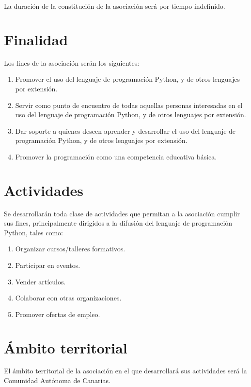 \documentclass[a4paper, 12pt, oneside]{book}
\begin{document}
La duración de la constitución de la asociación será por tiempo indefinido.

\section{Finalidad}

Los fines de la asociación serán los siguientes:

\begin{enumerate}
    \item Promover el uso del lenguaje de programación Python, y de otros lenguajes por extensión.
    \item Servir como punto de encuentro de todas aquellas personas interesadas en el uso del lenguaje de programación Python, y de otros lenguajes por extensión.
    \item Dar soporte a quienes deseen aprender y desarrollar el uso del lenguaje de programación Python, y de otros lenguajes por extensión.
    \item Promover la programación como una competencia educativa básica.
\end{enumerate}

\section{Actividades}

Se desarrollarán toda clase de actividades que permitan a la asociación cumplir sus fines, principalmente dirigidos a la difusión del lenguaje de programación Python, tales como:

\begin{enumerate}
    \item Organizar cursos/talleres formativos.
    \item Participar en eventos.
    \item Vender artículos.
    \item Colaborar con otras organizaciones.
    \item Promover ofertas de empleo.
\end{enumerate}

\section{Ámbito territorial}

El ámbito territorial de la asociación en el que desarrollará sus actividades será la Comunidad Autónoma de Canarias.
\end{document}
